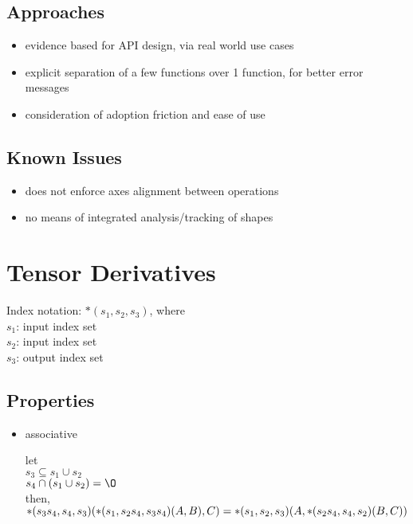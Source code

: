 \documentclass[8pt,letter]{article}
\begin{document}
\begin{multicols*}{2}
  \subsection{Approaches}
  
  \begin{itemize}
  \item evidence based for API design, via real world use cases
  \item explicit separation of a few functions over 1 function, for better error messages
  \item consideration of adoption friction and ease of use
  \end{itemize}

  \vfill\null
  \columnbreak
    
  \subsection{Known Issues}
  \begin{itemize}
  \item does not enforce axes alignment between operations
  \item no means of integrated analysis/tracking of shapes
  \end{itemize}
  
  \vfill\null
  \pagebreak

  \section{Tensor Derivatives}

  Index notation: $*(s_1,s_2,s_3)$, where\\
  $s_1$: input index set\\
  $s_2$: input index set\\
  $s_3$: output index set

  \subsection{Properties}

  \begin{itemize}
  \item associative
    
    let\\
    $ s_3 \subseteq s_1 \cup s_2$\\
    $s_4 \cap (s_1 \cup s_2) = \O$\\
    then,\\
    $*(s_3 s_4, s_4, s_3)(*(s_1, s_2 s_4, s_3 s_4)(A,B), C)\\
    =*(s_1, s_2, s_3)(A, *(s_2 s_4, s_4, s_2)(B,C))$


\end{itemize}
\end{multicols*}
\end{document}
